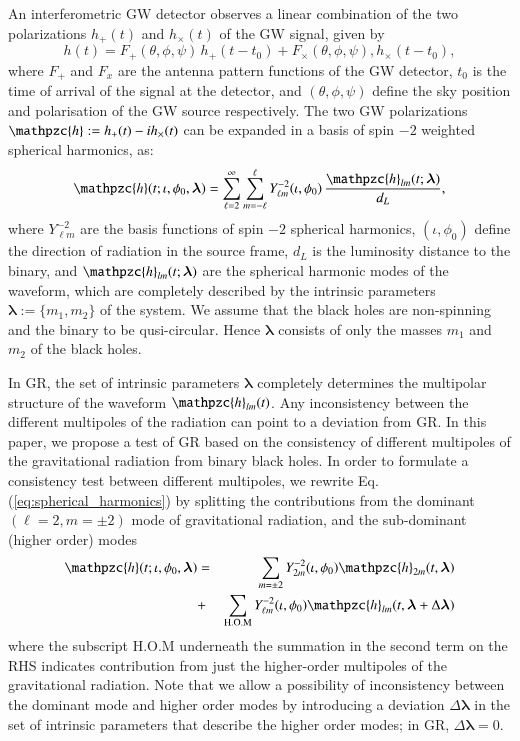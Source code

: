 \documentclass[prl,preprintnumbers,twocolumn,eqsecnum,floatfix,a4paper,nofootinbib,superscriptaddress]{revtex4}
\newcommand{\h}{\mathpzc{h}}
\newcommand{\Ylm}{{Y}^{-2}_{\ell m}}
\newcommand{\blambda}{\bm{\lambda}}
\begin{document}
An interferometric GW detector observes a linear combination of the two polarizations $h_+(t)$ and $h_\times(t)$ of the GW signal, given by 
\begin{equation}
h(t) = F_+(\theta, \phi, \psi) \, h_+(t-t_0) + F_{\times}(\theta, \phi, \psi), {h}_{\times}(t-t_0), 
\label{eq:det_response}
\end{equation}
where $F_+$ and $F_x$ are the antenna pattern functions of the GW detector, $t_0$ is the time of arrival of the signal at the detector, and $(\theta, \phi, \psi)$ define the sky position and polarisation of the GW source respectively. The two GW polarizations $\h := h_+(t) -i h_\times(t)$ can be expanded in a basis of spin $-2$ weighted spherical harmonics, as:
\begin{equation}
\h(t; \iota, \phi_0, \blambda) = \sum _{\ell=2}^{\infty} \sum _{m=-\ell}^{\ell} \Ylm (\iota, \phi_0) \, \frac{{\h}_{lm}(t; \blambda)}{d_L}, 
\label{eq:spherical_harmonics}
\end{equation}
where $\Ylm$ are the basis functions of spin $-2$ spherical harmonics, $(\iota, \phi_0)$ define the direction of radiation in the source frame, $d_L$ is  the luminosity distance to the binary, and 
${\h}_{lm}(t; \blambda)$ are the spherical harmonic modes of the waveform, which are completely described by the intrinsic parameters $\blambda := \{m_1, m_2\}$ of the system. We assume that the black holes are non-spinning and the binary to be qusi-circular. Hence $\blambda$ consists of only the masses $m_1$ and $m_2$ of the black holes. 

In GR, the set of intrinsic parameters $\blambda$ completely determines the multipolar structure of the waveform ${\h}_{lm}(t)$. Any inconsistency between the different multipoles of the radiation can point to a deviation from GR. In this paper, we propose a test of GR based on the consistency of different multipoles of the gravitational radiation from binary black holes. In order to formulate a consistency test between different multipoles, we rewrite Eq.(\ref{eq:spherical_harmonics}) by splitting the contributions from the dominant $(\ell = 2, m = \pm 2)$ mode of gravitational radiation, and the sub-dominant (higher order) modes 
\begin{eqnarray}
\h(t; \iota, \phi_0, \blambda) & = & \sum_{m = \pm2} Y^{-2}_{2m} (\iota, \phi_0) {\h}_{2m}(t, \blambda)  \nonumber \\ 
 & + & \sum _{\text{H.O.M}} \Ylm (\iota, \phi_0) \h_{lm}(t, \blambda+\Delta \blambda)
\label{eq:test_HM}
\end{eqnarray}
where the subscript H.O.M underneath the summation in the second term on the RHS indicates contribution from just the higher-order multipoles of the gravitational radiation. Note that we allow a possibility of inconsistency between the dominant mode and higher order modes by introducing a deviation $\Delta \blambda$ in the set of intrinsic parameters that describe the higher order modes; in GR,  $\Delta \blambda = 0$. 
\end{document}

